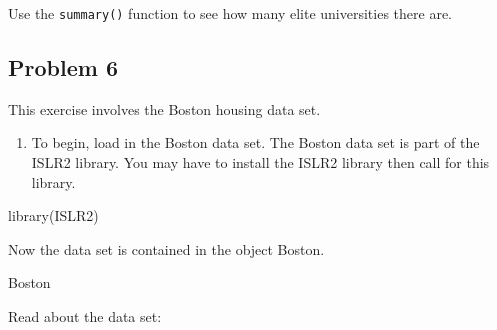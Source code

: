 \documentclass[
]{article}
\newenvironment{Shaded}{\begin{snugshade}}{\end{snugshade}}
\newcommand{\CommentTok}[1]{\textcolor[rgb]{0.56,0.35,0.01}{\textit{#1}}}
\newcommand{\DecValTok}[1]{\textcolor[rgb]{0.00,0.00,0.81}{#1}}
\newcommand{\FunctionTok}[1]{\textcolor[rgb]{0.00,0.00,0.00}{#1}}
\newcommand{\NormalTok}[1]{#1}
\newcommand{\OtherTok}[1]{\textcolor[rgb]{0.56,0.35,0.01}{#1}}
\newcommand{\SpecialCharTok}[1]{\textcolor[rgb]{0.00,0.00,0.00}{#1}}
\newcommand{\StringTok}[1]{\textcolor[rgb]{0.31,0.60,0.02}{#1}}
\providecommand{\tightlist}{%
  \setlength{\itemsep}{0pt}\setlength{\parskip}{0pt}}
\begin{document}
\begin{Shaded}
\end{Shaded}

Use the \texttt{summary()} function to see how many elite universities
there are.

\hypertarget{problem-6}{%
\subsection{Problem 6}\label{problem-6}}

This exercise involves the Boston housing data set.

\begin{enumerate}
\def\labelenumi{(\alph{enumi})}
\tightlist
\item
  To begin, load in the Boston data set. The Boston data set is part of
  the ISLR2 library. You may have to install the ISLR2 library then call
  for this library.
\end{enumerate}

\begin{Shaded}
\begin{Highlighting}[]
\FunctionTok{library}\NormalTok{(ISLR2)}
\end{Highlighting}
\end{Shaded}

Now the data set is contained in the object Boston.

\begin{Shaded}
\begin{Highlighting}[]
\NormalTok{Boston}
\end{Highlighting}
\end{Shaded}

Read about the data set:
\end{document}

